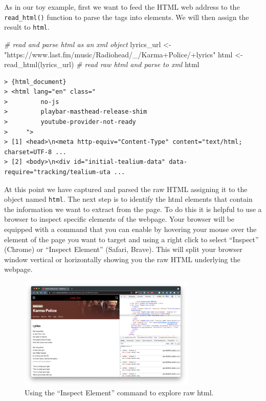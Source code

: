 \documentclass[
  letterpaper,
]{latex/krantz}
\newenvironment{Shaded}{\begin{snugshade}}{\end{snugshade}}
\newcommand{\CommentTok}[1]{\textcolor[rgb]{0.00,0.00,0.00}{\textit{#1}}}
\newcommand{\FunctionTok}[1]{\textcolor[rgb]{0.00,0.00,0.00}{#1}}
\newcommand{\NormalTok}[1]{\textcolor[rgb]{0.00,0.00,0.00}{#1}}
\newcommand{\OtherTok}[1]{\textcolor[rgb]{0.00,0.00,0.00}{#1}}
\newcommand{\StringTok}[1]{\textcolor[rgb]{0.00,0.00,0.00}{#1}}
\begin{document}
As in our toy example, first we want to feed the HTML web address to the
\texttt{read\_html()} function to parse the tags into elements. We will
then assign the result to \texttt{html}.

\begin{Shaded}
\begin{Highlighting}[]
\CommentTok{\# read and parse html as an xml object}
\NormalTok{lyrics\_url }\OtherTok{\textless{}{-}} \StringTok{"https://www.last.fm/music/Radiohead/\_/Karma+Police/+lyrics"}
\NormalTok{html }\OtherTok{\textless{}{-}} \FunctionTok{read\_html}\NormalTok{(lyrics\_url) }\CommentTok{\# read raw html and parse to xml}
\NormalTok{html}
\end{Highlighting}
\end{Shaded}

\begin{verbatim}
> {html_document}
> <html lang="en" class="
>         no-js
>         playbar-masthead-release-shim
>         youtube-provider-not-ready
>     ">
> [1] <head>\n<meta http-equiv="Content-Type" content="text/html; charset=UTF-8 ...
> [2] <body>\n<div id="initial-tealium-data" data-require="tracking/tealium-uta ...
\end{verbatim}

At this point we have captured and parsed the raw HTML assigning it to
the object named \texttt{html}. The next step is to identify the html
elements that contain the information we want to extract from the page.
To do this it is helpful to use a browser to inspect specific elements
of the webpage. Your browser will be equipped with a command that you
can enable by hovering your mouse over the element of the page you want
to target and using a right click to select ``Inspect'' (Chrome) or
``Inspect Element'' (Safari, Brave). This will split your browser window
vertical or horizontally showing you the raw HTML underlying the
webpage.

\begin{figure}[h]

{\centering \includegraphics[width=0.75\textwidth,height=\textheight]{figures/acquire-data/ad-lastfm-artist-inspect.png}

}

\caption{\label{fig-ad-inspect-element-artist-lastfm}Using the ``Inspect
Element'' command to explore raw html.}

\end{figure}
\end{document}
